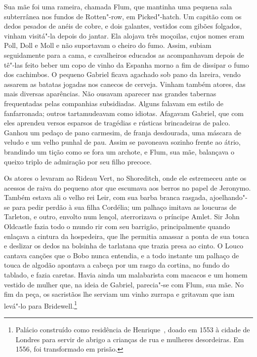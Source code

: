 Sua mãe foi uma rameira, chamada Flum, que mantinha uma pequena sala
subterrânea nos fundos de Rotten"-row, em Picked"-hatch. Um capitão com os
dedos pesados de anéis de cobre, e dois galantes, vestidos com gibões
folgados, vinham visitá"-la depois do jantar. Ela alojava três moçoilas,
cujos nomes eram Poll, Doll e Moll e não suportavam o cheiro do fumo.
Assim, subiam seguidamente para a cama, e cavalheiros educados as
acompanhavam depois de tê"-las feito beber um copo de vinho da Espanha
morno a fim de dissipar o fumo dos cachimbos. O pequeno Gabriel ficava
agachado sob pano da lareira, vendo assarem as batatas jogadas nos canecos
de cerveja. Vinham também atores, das mais diversas aparências. Não
ousavam aparecer nas grandes tabernas frequentadas pelas companhias
subsidiadas. Alguns falavam em estilo de fanfarronada; outros
tartamudeavam como idiotas. Afagavam Gabriel, que com eles aprendeu versos
esparsos de tragédias e rústicas brincadeiras de palco. Ganhou um pedaço
de pano carmesim, de franja desdourada, uma máscara de veludo e um velho
punhal de pau. Assim se pavoneava sozinho frente ao átrio, brandindo um
tição como se fora um archote, e Flum, sua mãe, balançava o queixo triplo
de admiração por seu filho precoce.

Os atores o levaram ao Rideau Vert, no Shoreditch, onde ele estremeceu ante
os acessos de raiva do pequeno ator que escumava aos berros no papel de
Jeronymo. Também estava ali o velho rei Leir, com sua barba branca
rasgada, ajoelhando"-se para pedir perdão à sua filha Cordélia; um palhaço
imitava as loucuras de Tarleton, e outro, envolto num lençol, aterrorizava
o príncipe Amlet. Sir John Oldcastle fazia todo o mundo rir com seu
barrigão, principalmente quando enlaçava a cintura da hospedeira, que lhe
permitia amassar a ponta de sua touca e deslizar os dedos na bolsinha de
tarlatana que trazia presa ao cinto. O Louco cantava canções que o Bobo
nunca entendia, e a todo instante um palhaço de touca de algodão apontava
a cabeça por um rasgo da cortina, no fundo do tablado, e fazia caretas.
Havia ainda um malabarista com macacos e um homem vestido de mulher que,
na ideia de Gabriel, parecia"-se com Flum, sua mãe. No fim da peça, os
sacristãos lhe serviam um vinho zurrapa e gritavam que iam levá"-lo para
Bridewell.\footnote{ Palácio construído como residência de Henrique~, 
doado em 1553 à cidade de Londres para servir de abrigo a crianças de
rua e mulheres desordeiras. Em 1556, foi transformado em prisão.}

